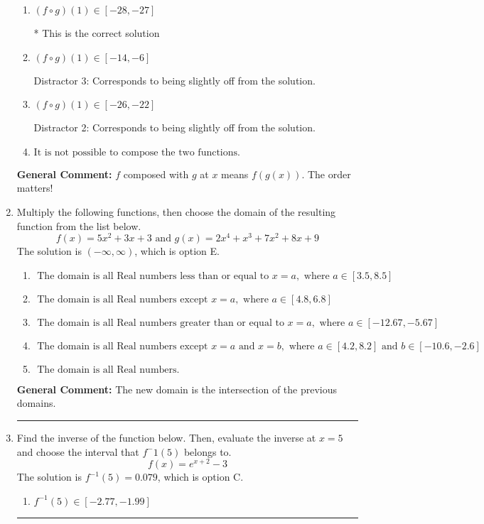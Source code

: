 \documentclass{extbook}[14pt]
\newcommand{\litem}[1]{\item #1

\rule{\textwidth}{0.4pt}}
\begin{document}
\begin{enumerate}
{\begin{enumerate}[label=\Alph*.]
 Distractor 1: Corresponds to reversing the composition.
\item \( (f \circ g)(1) \in [-28, -27] \)

* This is the correct solution
\item \( (f \circ g)(1) \in [-14, -6] \)

 Distractor 3: Corresponds to being slightly off from the solution.
\item \( (f \circ g)(1) \in [-26, -22] \)

 Distractor 2: Corresponds to being slightly off from the solution.
\item \( \text{It is not possible to compose the two functions.} \)


\end{enumerate}

\textbf{General Comment:} $f$ composed with $g$ at $x$ means $f(g(x))$. The order matters!
}
\litem{
Multiply the following functions, then choose the domain of the resulting function from the list below.
\[ f(x) = 5x^{2} +3 x + 3 \text{ and } g(x) = 2x^{4} + x^{3} +7 x^{2} +8 x + 9 \]The solution is \( (-\infty, \infty) \), which is option E.\begin{enumerate}[label=\Alph*.]
\item \( \text{ The domain is all Real numbers less than or equal to } x = a, \text{ where } a \in [3.5, 8.5] \)


\item \( \text{ The domain is all Real numbers except } x = a, \text{ where } a \in [4.8, 6.8] \)


\item \( \text{ The domain is all Real numbers greater than or equal to } x = a, \text{ where } a \in [-12.67, -5.67] \)


\item \( \text{ The domain is all Real numbers except } x = a \text{ and } x = b, \text{ where } a \in [4.2, 8.2] \text{ and } b \in [-10.6, -2.6] \)


\item \( \text{ The domain is all Real numbers. } \)


\end{enumerate}

\textbf{General Comment:} The new domain is the intersection of the previous domains.
}
\litem{
Find the inverse of the function below. Then, evaluate the inverse at $x = 5$ and choose the interval that $f^-1(5)$ belongs to.
\[ f(x) = e^{x+2}-3 \]The solution is \( f^{-1}(5) = 0.079 \), which is option C.\begin{enumerate}[label=\Alph*.]
\item \( f^{-1}(5) \in [-2.77, -1.99] \)


\end{enumerate}}
\end{enumerate}
\end{document}
